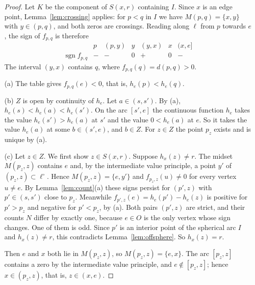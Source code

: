 \documentclass[11pt]{amsart}
\theoremstyle{definition}
\theoremstyle{remark}
\newcommand{\M}{M}
\newcommand{\Odd}{O}
\newcommand{\N}{N}
\newcommand{\sgn}{\operatorname{sgn}}
\begin{document}
\begin{proof}
Let $K$ be the component of $S(x,r)$ containing $I$. Since $x$ is an edge point, Lemma~\ref{lem:crossing} applies: for $p<q$ in $I$ we have $\M(p,q)=\{x,y\}$ with $y\in(p,q)$, and both zeros are crossings. Reading along $\ell$ from $p$ towards $e$, the sign of $f_{p,q}$ is therefore
\[
\begin{array}{c|ccccccc}
 & p & (p,y) & y & (y,x) & x & (x,e]\\ \hline
\sgn f_{p,q} & - & - & 0 & + & 0 & -
\end{array}
\]
The interval $(y,x)$ contains $q$, where $f_{p,q}(q)=d(p,q)>0$.

(a) The table gives $f_{p,q}(e)<0$, that is, $h_e(p)<h_e(q)$.

(b) $Z$ is open by continuity of $h_e$. Let $a\in(s,s')$. By (a), $h_e(s)<h_e(a)<h_e(s')$. On the arc $[s',e]$ the continuous function $h_e$ takes the value $h_e(s')>h_e(a)$ at $s'$ and the value $0<h_e(a)$ at $e$. So it takes the value $h_e(a)$ at some $b\in(s',e)$, and $b\in Z$. For $z\in Z$ the point $p_z$ exists and is unique by (a).

(c) Let $z\in Z$. We first show $z\in S(x,r)$. Suppose $h_x(z)\ne r$. The midset $\M(p_z,z)$ contains $e$ and, by the intermediate value principle, a point $y'$ of $(p_z,z)\subset\ell^\circ$. Hence $\M(p_z,z)=\{e,y'\}$ and $f_{p_z,z}(u)\ne0$ for every vertex $u\ne e$. By Lemma~\ref{lem:count}(a) these signs persist for $(p',z)$ with $p'\in(s,s')$ close to $p_z$. Meanwhile $f_{p',z}(e)=h_e(p')-h_e(z)$ is positive for $p'>p_z$ and negative for $p'<p_z$, by (a). Both pairs $(p',z)$ are strict, and their counts $\N$ differ by exactly one, because $e\in\Odd$ is the only vertex whose sign changes. One of them is odd. Since $p'$ is an interior point of the spherical arc $I$ and $h_x(z)\ne r$, this contradicts Lemma~\ref{lem:offsphere}. So $h_x(z)=r$.

Then $e$ and $x$ both lie in $\M(p_z,z)$, so $\M(p_z,z)=\{e,x\}$. The arc $[p_z,z]$ contains a zero by the intermediate value principle, and $e\notin[p_z,z]$; hence $x\in(p_z,z)$, that is, $z\in(x,e)$.
\end{proof}
\end{document}
